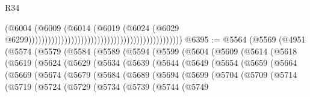 \begin{lexlean}{R34}
\begin{coremodule}
                                                                                      (@6004
                                                                                        (@6009
                                                                                          (@6014
                                                                                            (@6019
                                                                                              (@6024
                                                                                                (@6029
                                                                                                  @6299)))))))))))))))))))))))))))))))))))))))))))))))
@6395 := @5564
    (@5569
      (@4951
        (@5574
          (@5579
            (@5584
              (@5589
                (@5594
                  (@5599
                    (@5604
                      (@5609
                        (@5614
                          (@5618
                            (@5619
                              (@5624
                                (@5629
                                  (@5634
                                    (@5639
                                      (@5644
                                        (@5649
                                          (@5654
                                            (@5659
                                              (@5664
                                                (@5669
                                                  (@5674
                                                    (@5679
                                                      (@5684
                                                        (@5689
                                                          (@5694
                                                            (@5699
                                                              (@5704
                                                                (@5709
                                                                  (@5714
                                                                    (@5719
                                                                      (@5724
                                                                        (@5729
                                                                          (@5734
                                                                            (@5739
                                                                              (@5744
                                                                                (@5749

\end{coremodule}
\end{lexlean}
